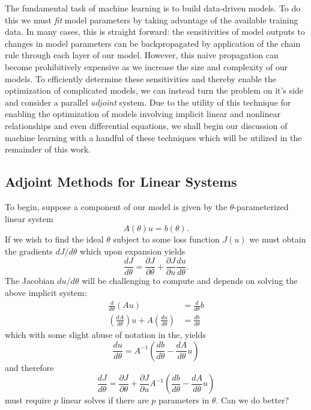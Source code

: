The fundamental task of machine learning is to build data-driven models. To do this we must \textit{fit} model parameters by taking advantage of the available training data. In many cases, this is straight forward: the sensitivities of model outputs to changes in model parameters can be backpropagated by application of the chain rule through each layer of our model. However, this naive propagation can become prohibitively expensive as we increase the size and complexity of our models. To efficiently determine these sensitivities and thereby enable the optimization of complicated models, we can instead turn the problem on it's side and consider a parallel \textit{adjoint} system. Due to the utility of this technique for enabling the optimization of models involving implicit linear and nonlinear relationships and even differential equations, we shall begin our discussion of machine learning with a handful of these techniques which will be utilized in the remainder of this work.

\subsection{Adjoint Methods for Linear Systems}
To begin, suppose a component of our model is given by the $\theta$-parameterized linear system
\begin{equation}
  A(\theta)u = b(\theta).
\end{equation}
If we wish to find the ideal $\theta$ subject to some loss function $J(u)$ we must obtain the gradients $dJ/d\theta$ which upon expansion yields
\begin{equation}
  \frac{dJ}{d\theta} = \frac{\partial J}{\partial \theta} + \frac{\partial J}{\partial u}\frac{du}{d\theta}.
\end{equation}
The Jacobian $du/d\theta$ will be challenging to compute and depends on solving the above implicit system:
\begin{align*}
  \frac{d}{d\theta}(Au) &= \frac{d}{d\theta}b \\
  \left(\frac{dA}{d\theta}\right)u + A\left(\frac{du}{d\theta}\right) &= \frac{db}{d\theta}
\end{align*}
which with some slight abuse of notation in the, yields
\begin{equation}
  \frac{du}{d\theta} = A^{-1}\left(\frac{db}{d\theta} - \frac{dA}{d\theta}u \right)
\end{equation}
and therefore
\begin{equation}
  \frac{dJ}{d\theta} = \frac{\partial J}{\partial \theta} + \frac{\partial J}{\partial u}A^{-1}\left(\frac{db}{d\theta} - \frac{dA}{d\theta}u \right)
\end{equation}
must require $p$ linear solves if there are $p$ parameters in $\theta$. Can we do better?

